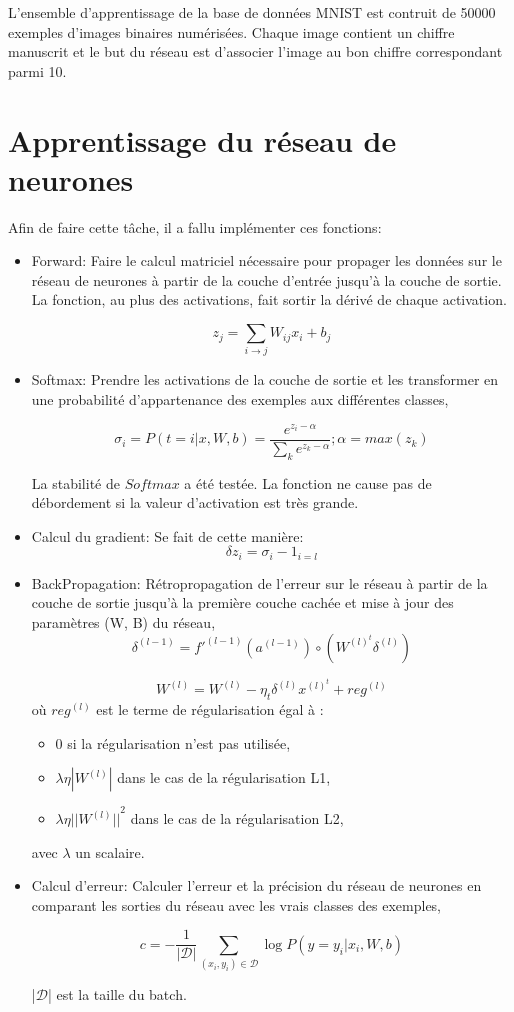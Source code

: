 \documentclass[a4paper,english,12pt]{article}
\begin{document}
L'ensemble d'apprentissage de la base de données MNIST est contruit de 50000 exemples d'images binaires numérisées. Chaque image contient un chiffre manuscrit et le but du réseau est d'associer l'image au bon chiffre correspondant parmi 10. 

\section{Apprentissage du réseau de neurones}
Afin de faire cette tâche, il a fallu implémenter ces fonctions:
\begin{itemize}
	\item Forward: Faire le calcul matriciel nécessaire pour propager les données sur le réseau de neurones à partir de la couche d'entrée jusqu'à la couche de sortie. La fonction, au plus des activations, fait sortir la dérivé de chaque activation.
	
	$$z_j = \sum_{i \rightarrow j} W_{ij} x_i + b_j$$
	
	\item Softmax: Prendre les activations de la couche de sortie et les transformer en une probabilité d'appartenance des exemples aux différentes classes,
	
	$$ \sigma_i = P(t=i|x,W,b) = \frac{e^{z_i-\alpha}}{\sum_k e^{z_k-\alpha}} ; \alpha=max(z_k)$$
	
	La stabilité de $Softmax$ a été testée. La fonction ne cause pas de débordement si la valeur d'activation est très grande.
	
	\item Calcul du gradient: Se fait de cette manière:	
		$$\delta z_i = \sigma_i - 1_{i=l}$$	
		
	\item BackPropagation: Rétropropagation de l'erreur sur le réseau à partir de la couche de sortie jusqu'à la première couche cachée et mise à jour des paramètres (W, B) du réseau,
		$$\delta^{(l-1)}=f'^{(l-1)}(a^{(l-1)}) \circ (W^{(l)^t}\delta^{(l)})$$
		
		$$W^{(l)}=W^{(l)}-\eta_t \delta^{(l)} x^{(l)^t}+reg^{(l)}$$
		où $reg^{(l)}$ est le terme de régularisation égal à :
		\begin{itemize}
			\item $0$ si la régularisation n'est pas utilisée,
			\item $\lambda \eta|W^{(l)}|$ dans le cas de la régularisation L1,
			\item $\lambda \eta{||W^{(l)}||}^2$ dans le cas de la régularisation L2,
		\end{itemize}
		avec $\lambda$ un scalaire.
	\item Calcul d'erreur: Calculer l'erreur et la précision du réseau de neurones en comparant les sorties du réseau avec les vrais classes des exemples,
	
	$$c = - \frac{1}{|\mathcal{D}|}\sum_{(x_{i}, y_{i}) \in \mathcal{D}} \log P(y=y_{i}|x_{i},W,b)$$
	
	
	|$\mathcal{D}$| est la taille du batch.
\end{itemize}
\end{document}
